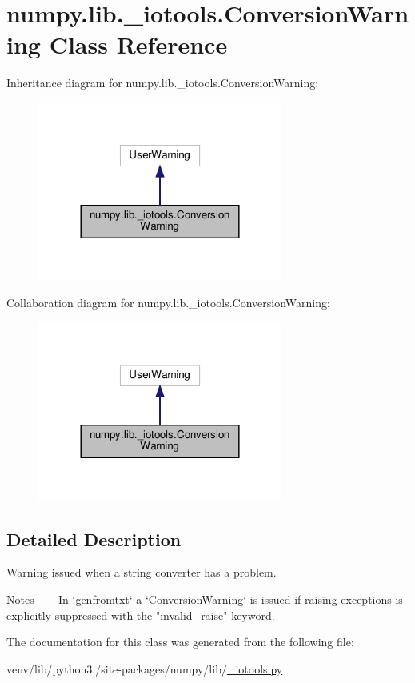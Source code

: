 \hypertarget{classnumpy_1_1lib_1_1__iotools_1_1ConversionWarning}{}\section{numpy.\+lib.\+\_\+iotools.\+Conversion\+Warning Class Reference}
\label{classnumpy_1_1lib_1_1__iotools_1_1ConversionWarning}


Inheritance diagram for numpy.\+lib.\+\_\+iotools.\+Conversion\+Warning\+:
\nopagebreak
\begin{figure}[H]
\begin{center}
\leavevmode
\includegraphics[width=228pt]{classnumpy_1_1lib_1_1__iotools_1_1ConversionWarning__inherit__graph}
\end{center}
\end{figure}


Collaboration diagram for numpy.\+lib.\+\_\+iotools.\+Conversion\+Warning\+:
\nopagebreak
\begin{figure}[H]
\begin{center}
\leavevmode
\includegraphics[width=228pt]{classnumpy_1_1lib_1_1__iotools_1_1ConversionWarning__coll__graph}
\end{center}
\end{figure}


\subsection{Detailed Description}
\begin{DoxyVerb}Warning issued when a string converter has a problem.

Notes
-----
In `genfromtxt` a `ConversionWarning` is issued if raising exceptions
is explicitly suppressed with the "invalid_raise" keyword.\end{DoxyVerb}
 

The documentation for this class was generated from the following file\+:\begin{DoxyCompactItemize}
\item 
venv/lib/python3./site-\/packages/numpy/lib/\hyperlink{__iotools_8py}{\+\_\+iotools.\+py}\end{DoxyCompactItemize}
